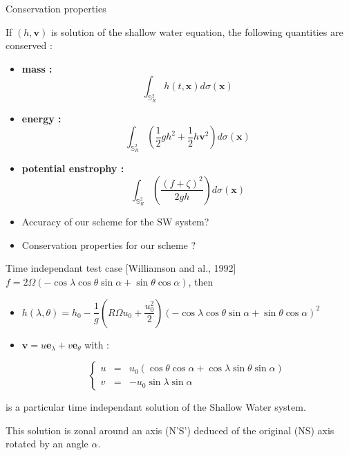 \documentclass[11pt]{beamer}
\def\gint{\displaystyle\int}
\begin{document}
\begin{frame}{Conservation properties}
\begin{block}{}
If $(h, \mathbf{v})$ is solution of the shallow water equation, the following quantities are conserved :

\begin{itemize}
\item \textbf{mass :} 
$$\gint_{\mathbb{S}^2_R} h(t, \mathbf{x}) d \sigma(\mathbf{x})$$
\item \textbf{energy :}
$$ \gint_{\mathbb{S}^2_R} \left( \dfrac{1}{2}gh^2 + \dfrac{1}{2} h \mathbf{v}^2 \right) d \sigma(\mathbf{x})$$
\item \textbf{potential enstrophy :}
$$\gint_{\mathbb{S}^2_R} \left( \dfrac{\left( f + \zeta \right)^2}{2gh} \right) d \sigma(\mathbf{x})$$
\end{itemize}
\end{block}

\begin{itemize}
\item Accuracy of our scheme for the SW system?
\item Conservation properties for our scheme ?
\end{itemize}
\end{frame}


\begin{frame}{Time independant test case [Williamson and al., 1992]}
$f = 2 \Omega \left( - \cos \lambda \cos \theta \sin \alpha + \sin \theta \cos \alpha \right)$, then

\begin{itemize}
\item $h(\lambda, \theta) = h_0 - \dfrac{1}{g} \left( R \Omega u_0 + \dfrac{u_0^2}{2} \right)\left( - \cos \lambda \cos \theta \sin \alpha + \sin \theta \cos \alpha \right)^2$

\item $\mathbf{v} = u \mathbf{e}_{\lambda}+ v \mathbf{e}_{\theta}$ with :
 

\begin{equation*}
\left\lbrace \begin{array}{rcl}
 u & = & u_0 ( \cos \theta \cos \alpha + \cos \lambda \sin \theta \sin \alpha)\\
 v & = & -u_0 \sin \lambda \sin \alpha
 \end{array} \right.
\end{equation*}
\end{itemize}
 
is a particular time independant solution of the Shallow Water system.

This solution is zonal around an axis (N'S') deduced of the original (NS) axis rotated by an angle $\alpha$.
\end{frame}
\end{document}
